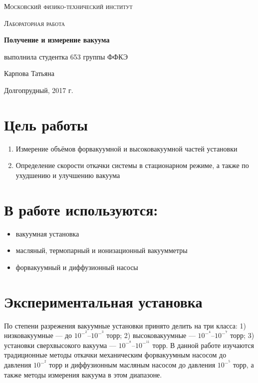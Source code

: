 \documentclass[a4paper]{article}
\begin{document}
\begin{titlepage}
	\centering
	\vspace{5cm}
	{\scshape\LARGE Московский физико-технический институт \par}
	\vspace{4cm}
	{\scshape\Large Лабораторная работа \par}
	\vspace{1cm}
	{\huge\bfseries Получение и измерение вакуума \par}
	\vspace{1cm}
	\vfill
\begin{flushright}
	{\large выполнила студентка 653 группы ФФКЭ}\par
	\vspace{0.3cm}
	{\LARGE Карпова Татьяна}
\end{flushright}
	

	\vfill

	Долгопрудный, 2017 г.
\end{titlepage}

\section{Цель работы}
\begin{enumerate}
    \item Измерение объёмов форвакуумной и высоковакуумной частей установки
    \item Определение скорости откачки системы в стационарном режиме, а также по ухудшению и улучшению вакуума
\end{enumerate}

\section{В работе используются:}
\begin{itemize}
    \item вакуумная установка
    \item масляный, термопарный и ионизационный вакуумметры
    \item форвакуумный и диффузионный насосы
\end{itemize}

\section{Экспериментальная установка}

По степени разрежения вакуумные установки принято делить на три класса: 1) низковакуумные — до $10^-^2$–$10^-^3$ торр; 2) высоковакуумные — $10^-^4$–$10^-^7$ торр; 3) установки сверхвысокого вакуума — $10^-^8$–$10^-^11$ торр. В данной работе изучаются традиционные методы откачки механическим форвакуумным насосом до давления $10^-^2$ торр и диффузионным масляным насосом до давления
$10^-^5$ торр, а также методы измерения вакуума в этом диапазоне.
\end{document}
